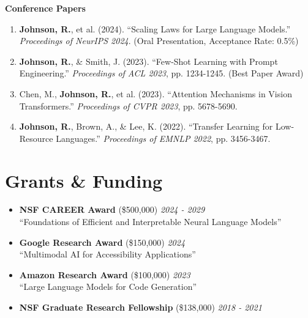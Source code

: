 \documentclass[11pt]{article}
\begin{document}
\vspace{0.15cm}

\textbf{Conference Papers}

\begin{enumerate}[leftmargin=*, itemsep=4pt]
    \item \textbf{Johnson, R.}, et al. (2024). ``Scaling Laws for Large Language Models.'' \textit{Proceedings of NeurIPS 2024}. (Oral Presentation, Acceptance Rate: 0.5\%)
    
    \item \textbf{Johnson, R.}, \& Smith, J. (2023). ``Few-Shot Learning with Prompt Engineering.'' \textit{Proceedings of ACL 2023}, pp. 1234-1245. (Best Paper Award)
    
    \item Chen, M., \textbf{Johnson, R.}, et al. (2023). ``Attention Mechanisms in Vision Transformers.'' \textit{Proceedings of CVPR 2023}, pp. 5678-5690.
    
    \item \textbf{Johnson, R.}, Brown, A., \& Lee, K. (2022). ``Transfer Learning for Low-Resource Languages.'' \textit{Proceedings of EMNLP 2022}, pp. 3456-3467.
\end{enumerate}

\vspace{0.2cm}

\section*{Grants \& Funding}

\begin{itemize}[leftmargin=*, itemsep=2pt]
    \item \textbf{NSF CAREER Award} (\$500,000) \hfill \textit{2024 - 2029} \\
    ``Foundations of Efficient and Interpretable Neural Language Models''
    
    \item \textbf{Google Research Award} (\$150,000) \hfill \textit{2024} \\
    ``Multimodal AI for Accessibility Applications''
    
    \item \textbf{Amazon Research Award} (\$100,000) \hfill \textit{2023} \\
    ``Large Language Models for Code Generation''
    
    \item \textbf{NSF Graduate Research Fellowship} (\$138,000) \hfill \textit{2018 - 2021}
\end{itemize}
\end{document}
